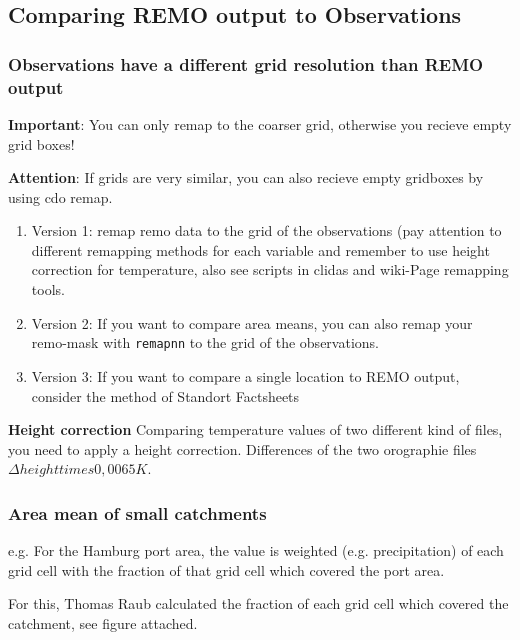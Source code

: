 \subsection{Comparing REMO output to Observations}

\subsubsection{Observations have a different grid resolution than REMO output}

\textbf{Important}: You can only remap to the coarser grid, otherwise you recieve empty grid boxes!

\textbf{Attention}: If grids are very similar, you can also recieve empty gridboxes by using cdo remap.
\begin{enumerate}
\item Version 1: remap remo data to the grid of the observations (pay attention to different remapping
methods for each variable and remember to use height correction for temperature,
also see scripts in clidas and wiki-Page remapping tools.

\item Version 2: If you want to compare area means, you can also remap your remo-mask with \texttt{remapnn} to the grid of the observations.

\item Version 3: If you want to compare a single location to REMO output, consider the method of Standort Factsheets 
\end{enumerate}

\textbf{Height correction} Comparing temperature values of two different kind of files, you need to apply a height correction. 
Differences of the two orographie files $\Delta height times 0,0065 K$.

\subsubsection{Area mean of small catchments}

e.g. For the Hamburg port area, the value is weighted (e.g. precipitation) of each grid cell with the fraction of that grid cell which covered the port area. 

For this, Thomas Raub calculated the fraction of each grid cell which covered the catchment, see figure attached. 

